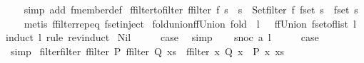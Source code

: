\begin{isabellebody}
%
\isadelimproof
\ \ %
\endisadelimproof
%
\isatagproof
{}\isamarkupfalse%
\ {\isacharparenleft}simp\ add{\isacharcolon}\ fmember{\isacharunderscore}def{\isacharparenright}%
\endisatagproof
{\isafoldproof}%
%
\isadelimproof
\isanewline
%
\endisadelimproof
\isanewline
{}\isamarkupfalse%
\ ffilter{\isacharunderscore}to{\isacharunderscore}filter{\isacharcolon}\ {\isachardoublequoteopen}{\isacharparenleft}ffilter\ f\ s\ {\isacharequal}\ s{\isacharprime}{\isacharparenright}\ {\isacharequal}\ {\isacharparenleft}Set{\isachardot}filter\ f\ {\isacharparenleft}fset\ s{\isacharparenright}\ {\isacharequal}\ fset\ s{\isacharprime}{\isacharparenright}{\isachardoublequoteclose}\isanewline
%
\isadelimproof
\ \ %
\endisadelimproof
%
\isatagproof
{}\isamarkupfalse%
\ {\isacharparenleft}metis\ ffilter{\isachardot}rep{\isacharunderscore}eq\ fset{\isacharunderscore}inject{\isacharparenright}%
\endisatagproof
{\isafoldproof}%
%
\isadelimproof
\isanewline
%
\endisadelimproof
\isanewline
{}\isamarkupfalse%
\ fold{\isacharunderscore}union{\isacharunderscore}ffUnion{\isacharcolon}\ {\isachardoublequoteopen}fold\ {\isacharparenleft}{\isacharbar}{\isasymunion}{\isacharbar}{\isacharparenright}\ l\ {\isacharbraceleft}{\isacharbar}{\isacharbar}{\isacharbraceright}\ {\isacharequal}\ ffUnion\ {\isacharparenleft}fset{\isacharunderscore}of{\isacharunderscore}list\ l{\isacharparenright}{\isachardoublequoteclose}\isanewline
%
\isadelimproof
%
\endisadelimproof
%
\isatagproof
{}\isamarkupfalse%
{\isacharparenleft}induct\ l\ rule{\isacharcolon}\ rev{\isacharunderscore}induct{\isacharparenright}\isanewline
{}\isamarkupfalse%
\ Nil\isanewline
\ \ \isamarkupfalse%
\ \isamarkupfalse%
\ {\isacharquery}case\ \isamarkupfalse%
\ simp\isanewline
{}\isamarkupfalse%
\isanewline
\ \ \isamarkupfalse%
\ {\isacharparenleft}snoc\ a\ l{\isacharparenright}\isanewline
\ \ \isamarkupfalse%
\ \isamarkupfalse%
\ {\isacharquery}case\isanewline
\ \ \ \ \isamarkupfalse%
\ simp\isanewline
{}\isamarkupfalse%
%
\endisatagproof
{\isafoldproof}%
%
\isadelimproof
\isanewline
%
\endisadelimproof
\isanewline
{}\isamarkupfalse%
\ filter{\isacharunderscore}filter{\isacharcolon}\ {\isachardoublequoteopen}ffilter\ P\ {\isacharparenleft}ffilter\ Q\ xs{\isacharparenright}\ {\isacharequal}\ ffilter\ {\isacharparenleft}{\isasymlambda}x{\isachardot}\ Q\ x\ {\isasymand}\ P\ x{\isacharparenright}\ xs{\isachardoublequoteclose}\isanewline

\end{isabellebody}
